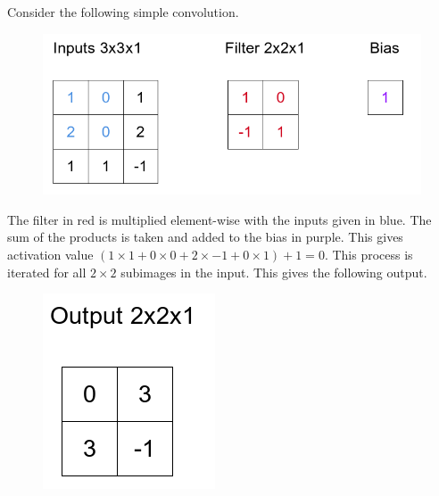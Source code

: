 %
%
%
\begin{example}
Consider the following simple convolution.
\begin{figure}[h]
\centering
\includegraphics[scale=0.5]{Images/4_conv_eg2.png}
\label{convnets-conv-eg}
\end{figure}

The filter in red is multiplied element-wise with the inputs given in blue. The sum of the products is taken and added to the bias in purple. This gives activation value $(1\times1 + 0\times0 + 2\times-1 + 0\times1) + 1 = 0$. This process is iterated for all $2\times2$ subimages in the input. This gives the following output.

\begin{figure}[h]
\centering
\includegraphics[scale=0.5]{Images/4_conv_eg2_2.png}
\end{figure}

\end{example}


